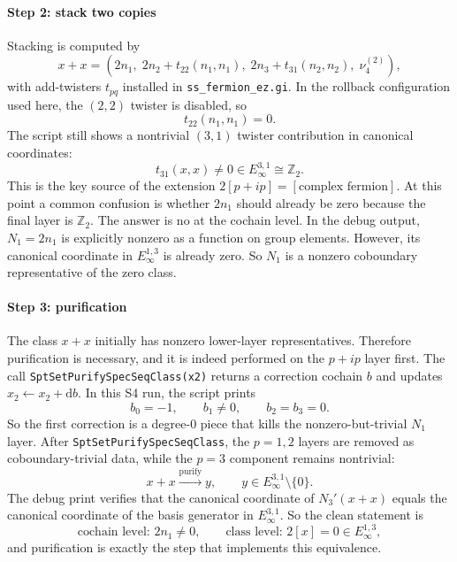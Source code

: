 \documentclass{SciPost}
\begin{document}
\paragraph{Step 2: stack two copies}
Stacking is computed by
\begin{equation}
x+x
= \left(2n_1,\; 2n_2 + t_{22}(n_1,n_1),\; 2n_3 + t_{31}(n_2,n_2),\; \nu_4^{(2)}\right),
\end{equation}
with add-twisters $t_{pq}$ installed in \texttt{ss\_fermion\_ez.gi}.
In the rollback configuration used here, the $(2,2)$ twister is disabled, so
\begin{equation}
t_{22}(n_1,n_1)=0.
\end{equation}
The script still shows a nontrivial $(3,1)$ twister contribution in canonical coordinates:
\begin{equation}
t_{31}(x,x)\neq 0 \in E_\infty^{3,1}\cong \mathbb Z_2.
\end{equation}
This is the key source of the extension $2[p+ip]=[\text{complex fermion}]$.
At this point a common confusion is whether $2n_1$ should already be zero because the final layer is $\mathbb Z_2$.
The answer is no at the cochain level.
In the debug output, $N_1=2n_1$ is explicitly nonzero as a function on group elements.
However, its canonical coordinate in $E_\infty^{1,3}$ is already zero.
So $N_1$ is a nonzero coboundary representative of the zero class.

\paragraph{Step 3: purification}
The class $x+x$ initially has nonzero lower-layer representatives.
Therefore purification is necessary, and it is indeed performed on the $p+ip$ layer first.
The call \texttt{SptSetPurifySpecSeqClass(x2)} returns a correction cochain $b$ and updates $x_2\leftarrow x_2+\mathrm d b$.
In this S4 run, the script prints
\begin{equation}
b_0=-1,\qquad b_1\neq 0,\qquad b_2=b_3=0.
\end{equation}
So the first correction is a degree-0 piece that kills the nonzero-but-trivial $N_1$ layer.
After \texttt{SptSetPurifySpecSeqClass}, the $p=1,2$ layers are removed as coboundary-trivial data, while the $p=3$ component remains nontrivial:
\begin{equation}
x+x \xrightarrow{\text{purify}} y,\qquad y\in E_\infty^{3,1}\setminus\{0\}.
\end{equation}
The debug print verifies that the canonical coordinate of $N_3'(x+x)$ equals the canonical coordinate of the basis generator in $E_\infty^{3,1}$.
So the clean statement is
\begin{equation}
\text{cochain level: }2n_1\neq 0,
\qquad
\text{class level: }2[x]=0\in E_\infty^{1,3},
\end{equation}
and purification is exactly the step that implements this equivalence.
\end{document}
